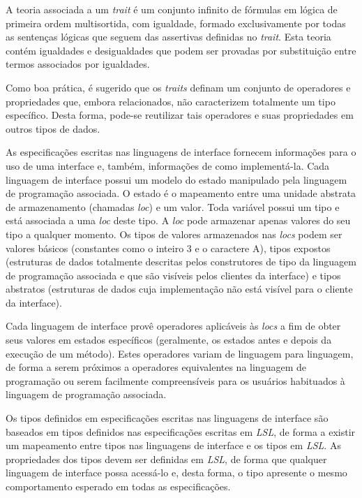 A teoria associada a um \textit{trait} é um conjunto infinito de fórmulas em lógica de primeira ordem multisortida, com igualdade, formado exclusivamente por todas as sentenças lógicas que seguem das assertivas definidas no \textit{trait}.
Esta teoria contém igualdades e desigualdades que podem ser provadas por substituição entre termos associados por igualdades.

Como boa prática, é sugerido que os \textit{traits} definam um conjunto de operadores e propriedades que, embora relacionados, não caracterizem totalmente um tipo específico.
Desta forma, pode-se reutilizar tais operadores e suas propriedades em outros tipos de dados.

As especificações escritas nas linguagens de interface fornecem informações para o uso de uma interface e, também, informações de como implementá-la.
Cada linguagem de interface possui um modelo do estado manipulado pela linguagem de programação associada.
O estado é o mapeamento entre uma unidade abstrata de armazenamento (chamadas \textit{loc}) e um valor.
Toda variável possui um tipo e está associada a uma \textit{loc} deste tipo.
A \textit{loc} pode armazenar apenas valores do seu tipo a qualquer momento.
Os tipos de valores armazenados nas \textit{locs} podem ser valores básicos (constantes como o inteiro 3 e o caractere A), tipos expostos (estruturas de dados totalmente descritas pelos construtores de tipo da linguagem de programação associada e que são visíveis pelos clientes da interface) e tipos abstratos (estruturas de dados cuja implementação não está visível para o cliente da interface).

Cada linguagem de interface provê operadores aplicáveis às \textit{locs} a fim de obter seus valores em estados específicos (geralmente, os estados antes e depois da execução de um método).
Estes operadores variam de linguagem para linguagem, de forma a serem próximos a operadores equivalentes na linguagem de programação ou serem facilmente compreensíveis para os usuários habituados à linguagem de programação associada.

Os tipos definidos em especificações escritas nas linguagens de interface são baseados em tipos definidos nas especificações escritas em \textit{LSL}, de forma a existir um mapeamento entre tipos nas linguagens de interface e os tipos em \textit{LSL}.
As propriedades dos tipos devem ser definidas em \textit{LSL}, de forma que qualquer linguagem de interface possa acessá-lo e, desta forma, o tipo apresente o mesmo comportamento esperado em todas as especificações.

